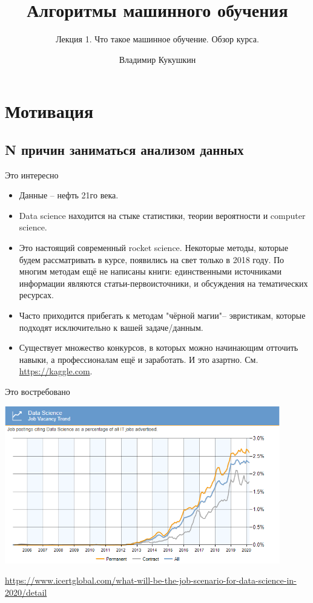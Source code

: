 \documentclass[9pt]{beamer}
\title{Алгоритмы машинного обучения}
\subtitle{Лекция 1. Что такое машинное обучение. Обзор курса.}
\author{Владимир Кукушкин}
\institute{СПбГЭУ - 11.11.2020}
\begin{document}
\titlepage

\section{Мотивация}

\subsection{N причин заниматься анализом данных}

\begin{frame}{Это интересно}
    \begin{itemize}
        \item Данные -- нефть 21го века.
        \item Data science находится на стыке статистики, теории вероятности и computer science.
        \item Это настоящий современный rocket science. Некоторые методы, которые будем рассматривать в курсе, появились на свет только в 2018 году. По многим методам ещё не написаны книги: единственными источниками информации являются статьи-первоисточники, и обсуждения на тематических ресурсах.
        \item Часто приходится прибегать к методам "чёрной магии"\;-- эвристикам, которые подходят исключительно к вашей задаче/данным.
        \item Существует множество конкурсов, в которых можно начинающим отточить навыки, а профессионалам ещё и заработать. И это азартно. См. \url{https://kaggle.com}.
    \end{itemize}
\end{frame}

\begin{frame}{Это востребовано}
\begin{center}
    \includegraphics[width=0.9\textwidth]{img/intro_job_trend.png}
\end{center}
\url{https://www.icertglobal.com/what-will-be-the-job-scenario-for-data-science-in-2020/detail}
\end{frame}
\end{document}
